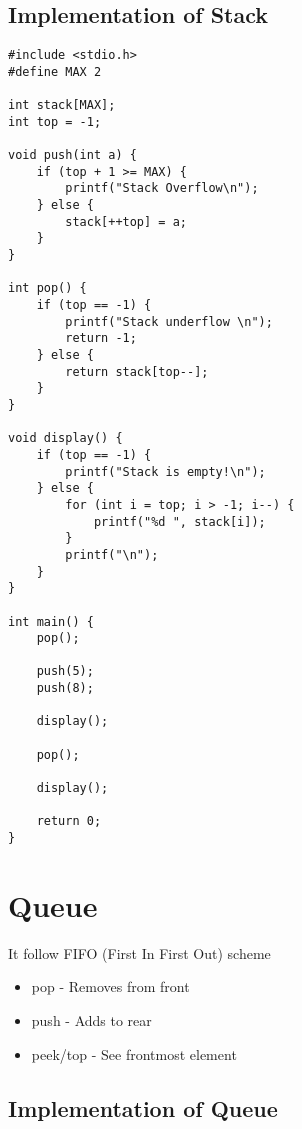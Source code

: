 \documentclass{article}
\begin{document}
\subsection{Implementation of Stack}

\begin{lstlisting}[caption={Implementation of Stack}]
#include <stdio.h>
#define MAX 2

int stack[MAX];
int top = -1;

void push(int a) {
    if (top + 1 >= MAX) {
        printf("Stack Overflow\n");
    } else {
        stack[++top] = a;
    }
}

int pop() {
    if (top == -1) {
        printf("Stack underflow \n");
        return -1;
    } else {
        return stack[top--];
    }
}

void display() {
    if (top == -1) {
        printf("Stack is empty!\n");
    } else {
        for (int i = top; i > -1; i--) {
            printf("%d ", stack[i]);
        }
        printf("\n");
    }
}

int main() {
    pop();

    push(5);
    push(8);

    display();

    pop();

    display();

    return 0;
}
\end{lstlisting}


\section{Queue}
It follow FIFO (First In First Out) scheme
\begin{itemize}
    \item pop - Removes from front
    \item push - Adds to rear
    \item peek/top - See frontmost element
\end{itemize}

\subsection{Implementation of Queue}
\end{document}
